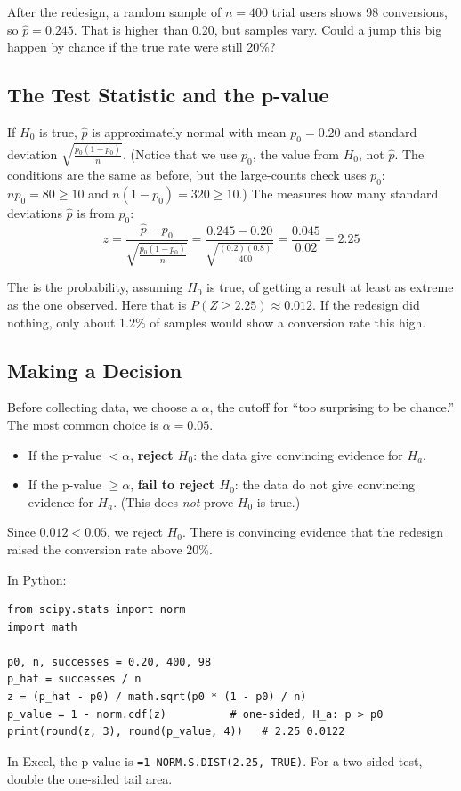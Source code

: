 After the redesign, a random sample of $n = 400$ trial users shows 98
conversions, so $\hat{p} = 0.245$. That is higher than 0.20, but samples
vary. Could a jump this big happen by chance if the true rate were still
20\%?

\subsection{The Test Statistic and the p-value}

If $H_0$ is true, $\hat{p}$ is approximately normal with mean $p_0 = 0.20$
and standard deviation $\sqrt{\frac{p_0(1-p_0)}{n}}$. (Notice that we use
$p_0$, the value from $H_0$, not $\hat{p}$. The conditions are the same
as before, but the large-counts check uses $p_0$: $np_0 = 80 \geq 10$ and
$n(1-p_0) = 320 \geq 10$.) The  measures how many
standard deviations $\hat{p}$ is from $p_0$:
$$z = \frac{\hat{p} - p_0}{\sqrt{\frac{p_0(1-p_0)}{n}}} = \frac{0.245 - 0.20}{\sqrt{\frac{(0.2)(0.8)}{400}}} = \frac{0.045}{0.02} = 2.25$$

The  is the probability, assuming $H_0$ is true, of getting
a result at least as extreme as the one observed. Here that is $P(Z \geq
2.25) \approx 0.012$. If the redesign did nothing, only about 1.2\% of
samples would show a conversion rate this high.

\subsection{Making a Decision}

Before collecting data, we choose a  $\alpha$,
the cutoff for ``too surprising to be chance.'' The most common choice is
$\alpha = 0.05$.
\begin{itemize}
\item If the p-value $< \alpha$, \textbf{reject $H_0$}: the data give
convincing evidence for $H_a$.
\item If the p-value $\geq \alpha$, \textbf{fail to reject $H_0$}: the data
do not give convincing evidence for $H_a$. (This does \emph{not} prove
$H_0$ is true.)
\end{itemize}
Since $0.012 < 0.05$, we reject $H_0$. There is convincing evidence that
the redesign raised the conversion rate above 20\%.

In Python:
\begin{verbatim}
from scipy.stats import norm
import math

p0, n, successes = 0.20, 400, 98
p_hat = successes / n
z = (p_hat - p0) / math.sqrt(p0 * (1 - p0) / n)
p_value = 1 - norm.cdf(z)          # one-sided, H_a: p > p0
print(round(z, 3), round(p_value, 4))   # 2.25 0.0122
\end{verbatim}
In Excel, the p-value is \texttt{=1-NORM.S.DIST(2.25, TRUE)}. For a
two-sided test, double the one-sided tail area.

